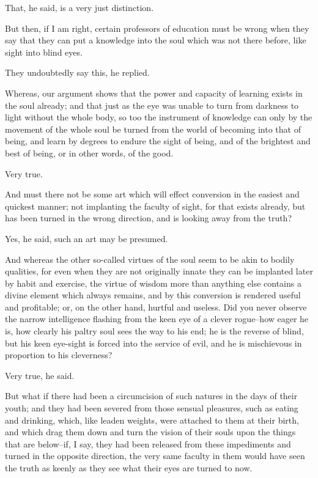 That, he said, is a very just distinction.

But then, if I am right, certain professors of education must be wrong
when they say that they can put a knowledge into the soul which was not
there before, like sight into blind eyes.

They undoubtedly say this, he replied.

Whereas, our argument shows that the power and capacity of learning
exists in the soul already; and that just as the eye was unable to turn
from darkness to light without the whole body, so too the instrument of
knowledge can only by the movement of the whole soul be turned from the
world of becoming into that of being, and learn by degrees to endure
the sight of being, and of the brightest and best of being, or in other
words, of the good.

Very true.

And must there not be some art which will effect conversion in the
easiest and quickest manner; not implanting the faculty of sight, for
that exists already, but has been turned in the wrong direction, and is
looking away from the truth?

Yes, he said, such an art may be presumed.

And whereas the other so-called virtues of the soul seem to be akin to
bodily qualities, for even when they are not originally innate they can
be implanted later by habit and exercise, the virtue of wisdom more than
anything else contains a divine element which always remains, and by
this conversion is rendered useful and profitable; or, on the other
hand, hurtful and useless. Did you never observe the narrow intelligence
flashing from the keen eye of a clever rogue--how eager he is, how
clearly his paltry soul sees the way to his end; he is the reverse of
blind, but his keen eye-sight is forced into the service of evil, and he
is mischievous in proportion to his cleverness?

Very true, he said.

But what if there had been a circumcision of such natures in the days
of their youth; and they had been severed from those sensual pleasures,
such as eating and drinking, which, like leaden weights, were attached
to them at their birth, and which drag them down and turn the vision
of their souls upon the things that are below--if, I say, they had been
released from these impediments and turned in the opposite direction,
the very same faculty in them would have seen the truth as keenly as
they see what their eyes are turned to now.

